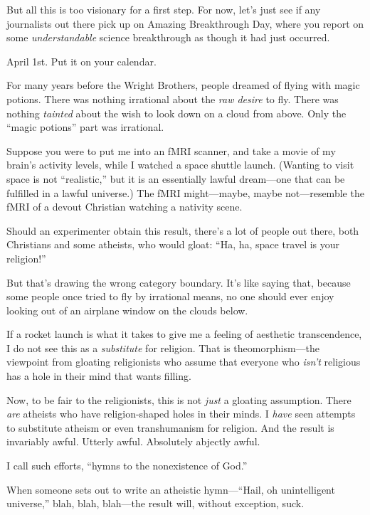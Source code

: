 {
 But all this is too visionary for a first step. For now,
let's just see if any journalists out there pick up on
Amazing Breakthrough Day, where you report on some
\textit{understandable} science breakthrough as though it had just
occurred.}

{
 April 1st. Put it on your calendar.}

\myendsectiontext


{
 For many years before the Wright Brothers, people dreamed of
flying with magic potions. There was nothing irrational about the
\textit{raw desire} to fly. There was nothing \textit{tainted} about
the wish to look down on a cloud from above. Only the
``magic potions'' part was
irrational.}

{
 Suppose you were to put me into an fMRI scanner, and take a movie
of my brain's activity levels, while I watched a space
shuttle launch. (Wanting to visit space is not
``realistic,'' but it is an
essentially lawful dream---one that can be fulfilled in a lawful
universe.) The fMRI might---maybe, maybe not---resemble the fMRI of a
devout Christian watching a nativity scene.}

{
 Should an experimenter obtain this result, there's
a lot of people out there, both Christians and some atheists, who would
gloat: ``Ha, ha, space travel is your
religion!''}

{
 But that's drawing the wrong category boundary.
It's like saying that, because some people once tried
to fly by irrational means, no one should ever enjoy looking out of an
airplane window on the clouds below.}

{
 If a rocket launch is what it takes to give me a feeling of
aesthetic transcendence, I do not see this as a \textit{substitute} for
religion. That is theomorphism---the viewpoint from gloating
religionists who assume that everyone who
\textit{isn't} religious has a hole in their mind that
wants filling.}

{
 Now, to be fair to the religionists, this is not \textit{just} a
gloating assumption. There \textit{are} atheists who have
religion-shaped holes in their minds. I \textit{have} seen attempts to
substitute atheism or even transhumanism for religion. And the result
is invariably awful. Utterly awful. Absolutely abjectly awful.}

{
 I call such efforts, ``hymns to the nonexistence
of God.''}

{
 When someone sets out to write an atheistic
hymn---``Hail, oh unintelligent
universe,'' blah, blah, blah---the result will,
without exception, suck.}

